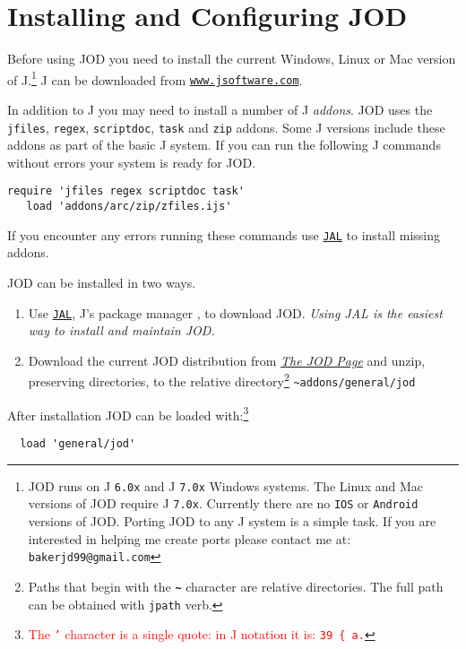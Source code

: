 \section{Installing and Configuring JOD}

Before using JOD you need to install the current Windows, Linux or Mac version of J.\footnote{JOD runs on 
 J \texttt{6.0x} and  J \texttt{7.0x} Windows systems. The Linux and Mac versions of JOD require J
\texttt{7.0x}. Currently there are no \texttt{IOS} or \texttt{Android} versions of JOD. Porting JOD 
to any J system is a simple task.
If you are interested in helping me create ports please contact me at:  
\texttt{bakerjd99@gmail.com}
} J can be downloaded from \href{http://www.jsoftware.com}{\texttt{www.jsoftware.com}}.

In addition to J you may need to install a number of J \emph{addons}. JOD uses the
\texttt{jfiles}, \texttt{regex}, \texttt{scriptdoc}, \texttt{task} and \texttt{zip} addons.  Some J versions
include these addons as part of the basic J system. If you can run the following J commands
without errors your system is ready for JOD. 
\begin{lstlisting}[frame=single,framerule=0pt,label=lst:reqaddons]
   require 'jfiles regex scriptdoc task'
   load 'addons/arc/zip/zfiles.ijs'
\end{lstlisting}
If you encounter any errors running these commands use \href{http://www.jsoftware.com/jwiki/JAL/}{\texttt{JAL}} to install 
missing addons.
 
JOD can be installed in two ways.  
\begin{enumerate}
	\item Use \href{http://www.jsoftware.com/jwiki/Addons/general/jod}{\texttt{JAL}}, J's package manager 
	\cite{jwiki:jal}, to download JOD. \emph{Using JAL is the easiest way to install and maintain JOD.}
	\item Download the current JOD distribution from \href{http://bakerjd99.wordpress.com/the-jod-page/}{\emph{The JOD Page}} \cite{baker:jodpages} and unzip, preserving directories, to the relative directory\footnote{Paths that begin with the \textbf{\texttt{\~}} character are relative directories. The full path can be obtained with \texttt{jpath} verb. } \verb|~addons/general/jod|
\end{enumerate}

After installation JOD can be loaded with:\footnote{
\textcolor{red}{The \texttt{'} character is a single quote: in J notation it is: \texttt{39 \{ a.}}
}
\begin{verbatim}
  load 'general/jod'
\end{verbatim}

